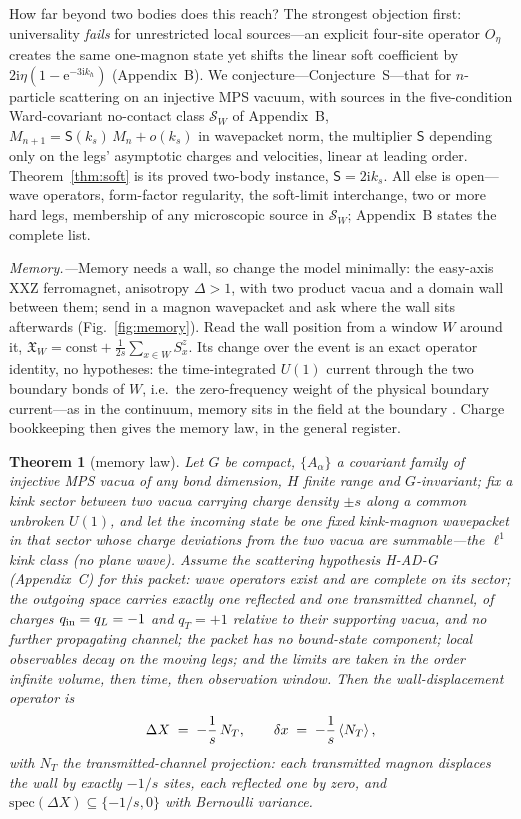 \documentclass[aps,prl,twocolumn,superscriptaddress,longbibliography,floatfix]{revtex4-2}
\newtheorem{theorem}{Theorem}
\newcommand{\ic}{\ensuremath{\mathrm{i}}}
\newcommand{\ec}{\ensuremath{\mathrm{e}}}
\begin{document}
How far beyond two bodies does this reach? The strongest objection
first: universality \emph{fails} for unrestricted local
sources---an explicit four-site operator $O_\eta$ creates the same
one-magnon state yet shifts the linear soft coefficient by
$2\ic\eta(1-\ec^{-3\ic k_h})$ (Appendix~B). We
conjecture---Conjecture~S---that for $n$-particle scattering on an
injective MPS vacuum, with sources in the five-condition Ward-covariant
no-contact class $\mathcal{S}_W$ of Appendix~B,
$M_{n+1}=\mathsf{S}(k_s)\,M_n+o(k_s)$ in wavepacket norm, the multiplier
$\mathsf{S}$ depending only on the legs' asymptotic charges and
velocities, linear at leading order. Theorem~\ref{thm:soft}
is its proved two-body instance, $\mathsf{S}=2\ic k_s$. All else is
open---wave operators, form-factor regularity, the soft-limit
interchange, two or more hard legs, membership of any microscopic source
in $\mathcal{S}_W$; Appendix~B states the complete list.

\emph{Memory.---}Memory needs a wall, so change the model minimally: the
easy-axis XXZ ferromagnet, anisotropy $\Delta>1$, with two product vacua
and a domain wall between them; send in a magnon wavepacket and ask
where the wall sits afterwards (Fig.~\ref{fig:memory}). Read the wall position
from a window $W$ around it,
$\mathfrak{X}_W=\mathrm{const}+\frac{1}{2s}\sum_{x\in W}S^z_x$. Its change
over the event is an exact operator identity, no hypotheses: the
time-integrated $U(1)$ current through the two boundary bonds of $W$, i.e.\
the zero-frequency weight of the physical boundary current---as in the
continuum, memory sits in the field at the boundary
\cite{Strominger2014,DeLuca2024}. Charge bookkeeping then
gives the memory law, in the general register.

\begin{theorem}[memory law]\label{thm:memory}
Let $G$ be compact, $\{A_\alpha\}$ a covariant family of injective MPS
vacua of any bond dimension, $H$ finite range and $G$-invariant; fix a
kink sector between two vacua carrying charge density $\pm s$ along a
common unbroken $U(1)$, and let the incoming state be one fixed
kink-magnon wavepacket in that sector whose charge deviations from the
two vacua are summable---the $\ell^1$ kink class (no plane wave).
Assume the scattering hypothesis H-AD-G (Appendix~C) for this packet: wave
operators exist and are complete on its sector; the outgoing space carries
exactly one reflected and one transmitted channel, of charges
$q_{\rm in}=q_L=-1$ and $q_T=+1$ relative to their supporting vacua,
and no further propagating channel; the packet has no bound-state
component; local observables decay on the moving legs; and the limits are
taken in the order infinite volume, then time, then observation window.
Then the wall-displacement operator is
\begin{equation}
\Delta X\;=\;-\frac{1}{s}\,N_T,\qquad
\delta x\;=\;-\frac{1}{s}\braket{N_T},
\label{eq:memory}
\end{equation}
with $N_T$ the transmitted-channel projection: each transmitted magnon
displaces the wall by exactly $-1/s$ sites, each reflected one by zero, and
$\mathrm{spec}(\Delta X)\subseteq\{-1/s,0\}$ with Bernoulli variance.
\end{theorem}
\end{document}
